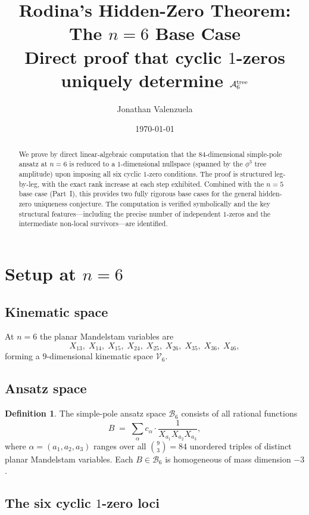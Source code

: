 \documentclass[11pt]{article}
\title{Rodina's Hidden-Zero Theorem: The $n=6$ Base Case\\[0.3em]
\large Direct proof that cyclic $1$-zeros uniquely determine $\mathcal{A}_6^{\mathrm{tree}}$}
\author{Jonathan Valenzuela}
\date{\today}
\theoremstyle{plain}
\theoremstyle{definition}
\newtheorem{definition}[theorem]{Definition}
\newcommand{\cB}{\mathcal{B}}
\newcommand{\cV}{\mathcal{V}}
\begin{document}
\maketitle

\begin{abstract}
We prove by direct linear-algebraic computation that the $84$-dimensional simple-pole
ansatz at $n=6$ is reduced to a $1$-dimensional nullspace (spanned by the $\phi^3$
tree amplitude) upon imposing all six cyclic $1$-zero conditions. The proof is
structured leg-by-leg, with the exact rank increase at each step exhibited. Combined
with the $n=5$ base case (Part~I), this provides two fully rigorous base cases for
the general hidden-zero uniqueness conjecture. The computation is verified
symbolically and the key structural features---including the precise number of
independent $1$-zeros and the intermediate non-local survivors---are identified.
\end{abstract}

\section{Setup at $n=6$}

\subsection{Kinematic space}

At $n=6$ the planar Mandelstam variables are
\[
X_{13},\; X_{14},\; X_{15},\; X_{24},\; X_{25},\; X_{26},\; X_{35},\; X_{36},\; X_{46},
\]
forming a $9$-dimensional kinematic space $\cV_6$.

\subsection{Ansatz space}

\begin{definition}
The simple-pole ansatz space $\cB_6$ consists of all rational functions
\[
B \;=\; \sum_{\alpha} c_\alpha \cdot \frac{1}{X_{a_1} X_{a_2} X_{a_3}},
\]
where $\alpha = (a_1, a_2, a_3)$ ranges over all $\binom{9}{3} = 84$ unordered
triples of distinct planar Mandelstam variables. Each $B \in \cB_6$ is homogeneous
of mass dimension $-3$.
\end{definition}

\subsection{The six cyclic $1$-zero loci}
\end{document}
